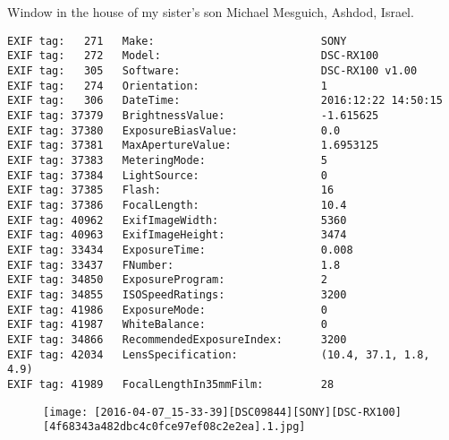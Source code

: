 \section{\protect{}}
\noindent Window in the house of my sister's son Michael Mesguich, Ashdod, Israel.
\noindent
\begin{lstlisting}
EXIF tag:   271   Make:                          SONY
EXIF tag:   272   Model:                         DSC-RX100
EXIF tag:   305   Software:                      DSC-RX100 v1.00
EXIF tag:   274   Orientation:                   1
EXIF tag:   306   DateTime:                      2016:12:22 14:50:15
EXIF tag: 37379   BrightnessValue:               -1.615625
EXIF tag: 37380   ExposureBiasValue:             0.0
EXIF tag: 37381   MaxApertureValue:              1.6953125
EXIF tag: 37383   MeteringMode:                  5
EXIF tag: 37384   LightSource:                   0
EXIF tag: 37385   Flash:                         16
EXIF tag: 37386   FocalLength:                   10.4
EXIF tag: 40962   ExifImageWidth:                5360
EXIF tag: 40963   ExifImageHeight:               3474
EXIF tag: 33434   ExposureTime:                  0.008
EXIF tag: 33437   FNumber:                       1.8
EXIF tag: 34850   ExposureProgram:               2
EXIF tag: 34855   ISOSpeedRatings:               3200
EXIF tag: 41986   ExposureMode:                  0
EXIF tag: 41987   WhiteBalance:                  0
EXIF tag: 34866   RecommendedExposureIndex:      3200
EXIF tag: 42034   LensSpecification:             (10.4, 37.1, 1.8, 4.9)
EXIF tag: 41989   FocalLengthIn35mmFilm:         28

\end{lstlisting}
\clearpage
\begin{figure}
\raggedleft
\texttt{[image: [2016-04-07\_15-33-39][DSC09844][SONY][DSC-RX100][4f68343a482dbc4c0fce97ef08c2e2ea].1.jpg]}
\end{figure}


\clearpage
